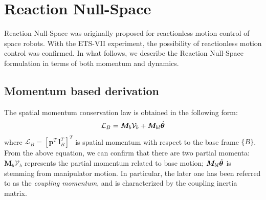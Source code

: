 

\section{Reaction Null-Space}
Reaction Null-Space was originally proposed for
reactionless motion control of space robots.
With the ETS-VII experiment,
the possibility of reactionless motion control was confirmed.
In what follows, we describe the Reaction Null-Space formulation in terms of both momentum and dynamics.

\subsection{Momentum based derivation}
The spatial momentum conservation law is obtained in the following form:
%
\begin{align}
  \mathcal{L}_{B} = \bm{M}_{b}\mathcal{V}_{b} + \bm{M}_{bl}{\dot{\bm{\theta}}}\label{eq:SPA_MOM}
\end{align}
%
where $\mathcal{L}_{B} = [\bm{p}^{T}~\bm{l}_{B}^{T}]^{T}$ is spatial momentum with respect to the base frame $\{B\}$.
From the above equation,
we can confirm that there are two partial momenta:
$\bm{M}_{b}\mathcal{V}_{b}$ represents the partial momentum related to base motion;
$\bm{M}_{bl}{\dot{\bm{\theta}}}$ is stemming from manipulator motion.
In particular, the later one has been referred to as the \textit{coupling momentum},
and is characterized by the coupling inertia matrix.

